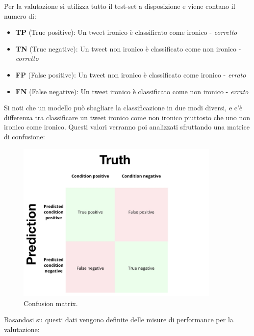 \documentclass[oneside]{book}
\begin{document}
Per la valutazione si utilizza tutto il test-set a disposizione e viene contano il numero di:
\begin{itemize}
	\item \textbf{TP} (True positive): Un tweet ironico è classificato come ironico - \emph{corretto}
	
	\item \textbf{TN} (True negative): Un tweet non ironico è classificato come non ironico - \emph{corretto}
	
	\item \textbf{FP} (False positive):	Un tweet non ironico è classificato come ironico - \emph{errato}
	
	\item \textbf{FN} (False negative):	Un tweet ironico è classificato come non ironico - \emph{errato}
\end{itemize}
Si noti che un modello può sbagliare la classificazione in due modi diversi, e c'è differenza tra classificare un tweet ironico come non ironico piuttosto che uno non ironico come ironico. Questi valori verranno poi analizzati sfruttando una matrice di confusione:

\begin{figure}[!h]
	\centering
	\includegraphics[width=10cm]{assets/confusion-matrix.jpg}
	\caption[Caption for LOF]{Confusion matrix.\footnotemark}
\end{figure}


Basandosi su questi dati vengono definite delle misure di performance per la valutazione:
\end{document}
